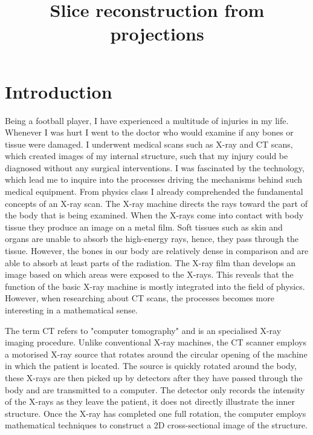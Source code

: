 \documentclass[12pt]{article}
\title{Slice reconstruction from projections}
\begin{document}
\maketitle

\clearpage
\setcounter{page}{2}                    %
\tableofcontents 
\clearpage       
\section{Introduction}
Being a football player, I have experienced a multitude of injuries in my life. Whenever I was hurt I went to the doctor who would examine if any bones or tissue were damaged. I underwent medical scans such as X-ray and CT scans, which created images of my internal structure, such that my injury could be diagnosed without any surgical interventions. I was fascinated by the technology, which lead me to inquire into the processes driving the mechanisms behind such medical equipment. From physics class I already comprehended the fundamental concepts of an X-ray scan. The X-ray machine directs the rays toward the part of the body that is being examined. When the X-rays come into contact with body tissue they produce an image on a metal film. Soft tissues such as skin and organs are unable to absorb the high-energy rays, hence, they pass through the tissue. However, the bones in our body are relatively dense in comparison and are able to absorb at least parts of the radiation. The X-ray film than develops an image based on which areas were exposed to the X-rays. This reveals that the function of the basic X-ray machine is mostly integrated into the field of physics. However, when researching about CT scans, the processes becomes more interesting in a mathematical sense.

The term CT refers to "computer tomography" and is an specialised X-ray imaging procedure. Unlike conventional X-ray machines, the CT scanner employs a motorised X-ray source that rotates around the circular opening of the machine in which the patient is located. The source is quickly rotated around the body, these X-rays are then picked up by detectors after they have passed through the body and are transmitted to a computer. The detector only records the intensity of the X-rays as they leave the patient, it does not directly illustrate the inner structure. Once the X-ray has completed one full rotation, the computer employs mathematical techniques to construct a 2D cross-sectional image of the structure. 
\end{document}
